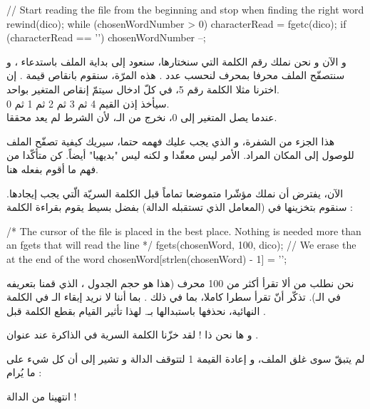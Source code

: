 \begin{Csource}
// Start reading the file from the beginning and stop when finding the right word
rewind(dico);
while (chosenWordNumber   > 0)
{
	characterRead = fgetc(dico);
	if (characterRead == '\n')
    	 chosenWordNumber --;
}
\end{Csource}

و الآن و نحن نملك رقم الكلمة التي سنختارها، سنعود إلى بداية الملف باستدعاء
،
و سنتصفّح الملف محرفا بمحرف لنحسب عدد
.
هذه المرّة، سنقوم بانقاص قيمة
.
إن اخترنا مثلا الكلمة رقم 5، في كلّ ادخال سيتمّ إنقاص المتغير
بواحد.\\
سيأخذ إذن القيم 4 ثم 3 ثم 2 ثم 1 ثم 0. \\
عندما يصل المتغير إلى 0، نخرج من الـ،
لأن الشرط
لم يعد محققا.

هذا الجزء من الشفرة، و الذي يجب عليك فهمه حتما، سيريك كيفية تصفّح الملف للوصول إلى المكان المراد. الأمر ليس معقّدا و لكنه ليس "بديهيا" أيضاً. كن متأكّدا من فهم ما أقوم بفعله هنا.

الآن، يفترض أن نملك مؤشّرا متموضعا تماماً قبل الكلمة السريّة الّتي يجب إيجادها.
سنقوم بتخزينها في
(المعامل الذي تستقبله الدالة) بفضل
بسيط يقوم بقراءة الكلمة :

\begin{Csource}
/* The cursor of the file is placed in the best place.
Nothing is needed more than an fgets that will read the line */
fgets(chosenWord, 100, dico);
// We erase the \n at the end of the word
chosenWord[strlen(chosenWord) - 1] = '\0';
\end{Csource}

نحن نطلب من
ألا تقرأ أكثر من 100 محرف (هذا هو حجم الجدول
،
الذي قمنا بتعريفه في الـ).
تذكّر أنّ
تقرأ سطرا كاملا، بما في ذلك
.
بما أننا لا نريد إبقاء الـ
في الكلمة النهائية، نحذفها باستبدالها بـ.
لهذا تأثير القيام بقطع الكلمة قبل
.

و ها نحن ذا ! لقد خزّنا الكلمة السرية في الذاكرة عند عنوان
.

لم يتبقّ سوى غلق الملف، و إعادة القيمة 1 لتتوقف الدالة و تشير إلى أن كل شيء على ما يُرام :

\begin{Csource}
  fclose(dico);
  return 1; // Everything is okay, return 1
}
\end{Csource}
انتهينا من الدالة
 !
